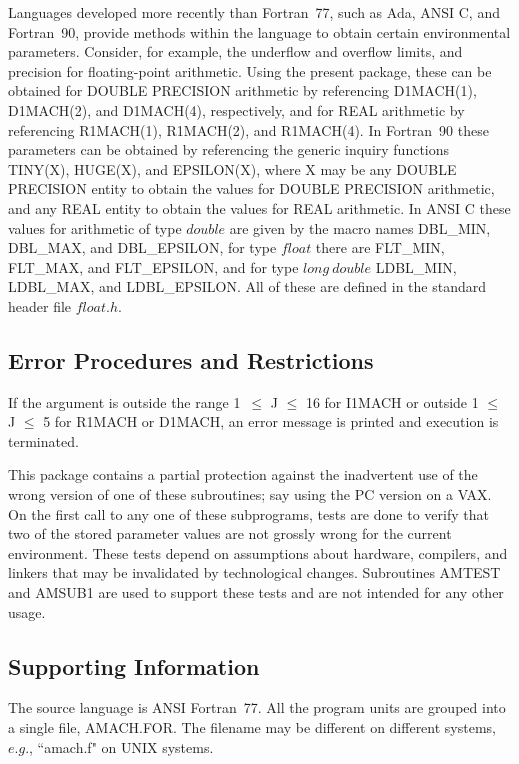 \documentclass[twoside]{MATH77}
\begin{document}
Languages developed more recently than Fortran~77, such as Ada, ANSI C, and
Fortran~90, provide methods within the language to obtain certain
environmental parameters. Consider, for example, the underflow and overflow
limits, and precision for floating-point arithmetic. Using the present
package, these can be obtained for DOUBLE PRECISION arithmetic by
referencing D1MACH(1), D1MACH(2), and D1MACH(4), respectively, and for REAL
arithmetic by referencing R1MACH(1), R1MACH(2), and R1MACH(4). In Fortran~90
these parameters can be obtained by referencing the generic inquiry
functions TINY(X), HUGE(X), and EPSILON(X), where X may be any DOUBLE
PRECISION entity to obtain the values for DOUBLE PRECISION arithmetic, and
any REAL entity to obtain the values for REAL arithmetic. In ANSI C these
values for arithmetic of type $double$ are given by the macro names DBL\_MIN,
DBL\_MAX, and DBL\_EPSILON, for type $float$ there are FLT\_MIN, FLT\_MAX,
and FLT\_EPSILON, and for type $long\ double$ LDBL\_MIN, LDBL\_MAX, and
LDBL\_EPSILON.  All of these are defined in the standard
header file $float.h$.




\subsection{Error Procedures and Restrictions}

If the argument is outside the range 1\ $\leq $ J $\leq $ 16 for I1MACH or
outside 1 $\leq $ J $\leq $ 5 for R1MACH or D1MACH, an error message is
printed and execution is terminated.

This package contains a partial protection against the inadvertent use of
the wrong version of one of these subroutines; say using the PC version on a
VAX. On the first call to any one of these subprograms, tests are done to
verify that two of the stored parameter values are not grossly wrong for the
current environment. These tests depend on assumptions about hardware,
compilers, and linkers that may be invalidated by technological changes.
Subroutines AMTEST and AMSUB1 are used to support these tests and are not
intended for any other usage.

\subsection{Supporting Information}

The source language is ANSI Fortran~77. All the program units are
grouped into a single file, AMACH.FOR. The filename may be different
on different systems, $e.g.$, ``amach.f" on UNIX systems.
\end{document}
